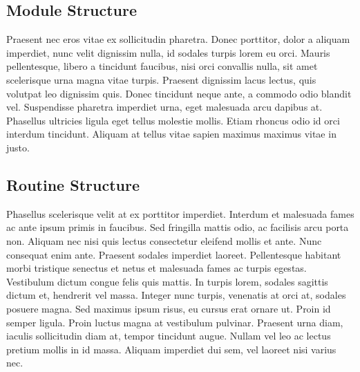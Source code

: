 \subsection{Module Structure}
Praesent nec eros vitae ex sollicitudin pharetra. Donec porttitor, dolor a aliquam imperdiet, nunc velit dignissim nulla, id sodales turpis lorem eu orci. Mauris pellentesque, libero a tincidunt faucibus, nisi orci convallis nulla, sit amet scelerisque urna magna vitae turpis. Praesent dignissim lacus lectus, quis volutpat leo dignissim quis. Donec tincidunt neque ante, a commodo odio blandit vel. Suspendisse pharetra imperdiet urna, eget malesuada arcu dapibus at. Phasellus ultricies ligula eget tellus molestie mollis. Etiam rhoncus odio id orci interdum tincidunt. Aliquam at tellus vitae sapien maximus maximus vitae in justo.

\subsection{Routine Structure}
Phasellus scelerisque velit at ex porttitor imperdiet. Interdum et malesuada fames ac ante ipsum primis in faucibus. Sed fringilla mattis odio, ac facilisis arcu porta non. Aliquam nec nisi quis lectus consectetur eleifend mollis et ante. Nunc consequat enim ante. Praesent sodales imperdiet laoreet. Pellentesque habitant morbi tristique senectus et netus et malesuada fames ac turpis egestas. Vestibulum dictum congue felis quis mattis. In turpis lorem, sodales sagittis dictum et, hendrerit vel massa. Integer nunc turpis, venenatis at orci at, sodales posuere magna. Sed maximus ipsum risus, eu cursus erat ornare ut. Proin id semper ligula. Proin luctus magna at vestibulum pulvinar. Praesent urna diam, iaculis sollicitudin diam at, tempor tincidunt augue. Nullam vel leo ac lectus pretium mollis in id massa. Aliquam imperdiet dui sem, vel laoreet nisi varius nec.
